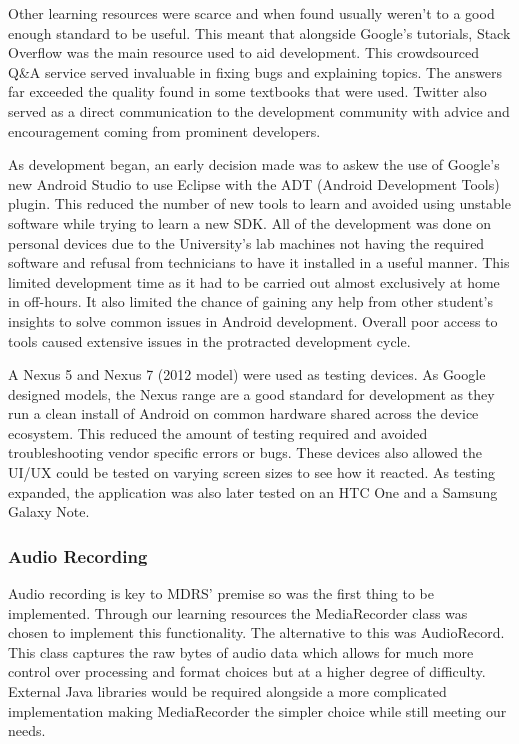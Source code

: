 \documentclass{l3proj}
\begin{document}
Other learning resources were scarce and when found usually weren't to a good
enough standard to be useful. This meant that alongside Google's tutorials,
Stack Overflow was the main resource used to aid development. This crowdsourced
Q&A service served invaluable in fixing bugs and explaining topics. The answers
far exceeded the quality found in some textbooks that were used. Twitter also served as a direct communication to the development community with advice and encouragement coming from prominent developers.

As development began, an early decision made was to askew the use of Google's
new Android Studio to use Eclipse with the ADT (Android Development Tools)
plugin. This reduced the number of new tools to learn and avoided using unstable
software while trying to learn a new SDK. All of the development was done on
personal devices due to the University's lab machines not having the required
software and refusal from technicians to have it installed in a useful manner.
This limited development time as it had to be carried out almost exclusively at
home in off-hours. It also limited the chance of gaining any help from other
student's insights to solve common issues in Android development. Overall poor
access to tools caused extensive issues in the protracted  development cycle.

A Nexus 5 and Nexus 7 (2012 model) were used as testing devices. As Google
designed models, the Nexus range are a good standard for development as they run
a clean install of Android on common hardware shared across the device
ecosystem. This reduced the amount of testing required and avoided
troubleshooting vendor specific errors or bugs. These devices also allowed the
UI/UX could be tested on varying screen sizes to see how it reacted. As testing
expanded, the application was also later tested on an HTC One and a Samsung Galaxy
Note.

\subsubsection{Audio Recording}    Audio recording is key to MDRS' premise so
was the first thing to be implemented. Through our learning resources the
MediaRecorder class was chosen to implement this functionality. The alternative
to this was AudioRecord. This class captures the raw bytes of audio data which
allows for much more control over processing and format choices but at a higher
degree of difficulty. External Java libraries would be required alongside a more
complicated implementation making MediaRecorder the simpler choice while still
meeting our needs.
\end{document}
